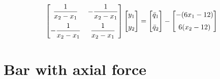 \documentclass[letterpaper,10pt]{article}
\begin{document}
\begin{equation}
\begin{bmatrix}
\displaystyle
\frac{1}{x_2-x_1} &
\displaystyle
-\frac{1}{x_2-x_1}\vspace{2mm} \\
\displaystyle
-\frac{1}{x_2-x_1} &
\displaystyle
\frac{1}{x_2-x_1}
\end{bmatrix}
\begin{bmatrix}
y_1 \vspace{2mm}\\
y_2
\end{bmatrix}
=
\begin{bmatrix}
\displaystyle
\bar{q}_1 \vspace{2mm}\\
\displaystyle
\bar{q}_2
\end{bmatrix}
-
\begin{bmatrix}
\displaystyle
-(6x_1-12) \vspace{2mm}\\
\displaystyle
6(x_2 - 12)
\end{bmatrix}
\end{equation}

\section{Bar with axial force}
\end{document}
